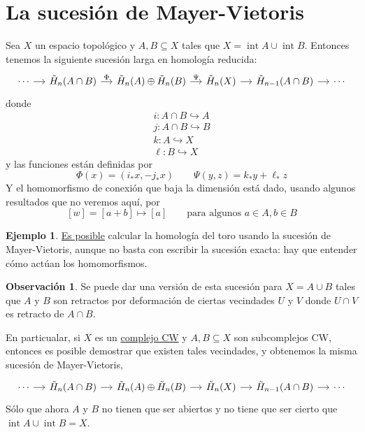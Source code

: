 \documentclass[spanish]{book}
\theoremstyle{definition}
\newtheorem*{obs}{Observación}
\newtheorem*{ejem}{Ejemplo}
\DeclareMathOperator{\Int}{int}
\begin{document}
\section{La sucesión de Mayer-Vietoris}
	Sea $X$ un espacio topológico y $A,B\subseteq X$ tales que $X=\Int A\cup \Int B$. Entonces tenemos la siguiente sucesión larga en homología reducida:
	\[\begin{tikzcd}[column sep= small]
		\cdots \arrow[r] & \tilde{H}_n(A\cap B) \arrow[r,"\Phi"] & \tilde{H}_n(A) \oplus \tilde{H}_n(B) \arrow[r,"\Psi"] & \tilde{H}_n(X) \arrow[r] & \tilde{H}_{n-1}(A\cap B) \arrow[r] &\cdots
	\end{tikzcd}\]
	donde 
	\begin{align*}
		i:A\cap B\hookrightarrow A\\
		j:A\cap B\hookrightarrow B\\
		k:A\hookrightarrow X\\
		\ell:B\hookrightarrow X
	\end{align*}
	y las funciones están definidas por
	\[\Phi(x)=(i_*x,-j_*x)\qquad\Psi(y,z)=k_*y+\ell_*z \]
	Y el homomorfismo de conexión que baja la dimensión está dado, usando algunos resultados que no veremos aquí, por
	\[[w]=[a+b]\mapsto[a]\qquad\text{para algunos }a\in A,b\in B\]
	\begin{ejem}
		\href{https://math.stackexchange.com/questions/58311/the-homology-groups-of-t2-by-mayer-vietoris}{Es posible} calcular la homología del toro usando la sucesión de Mayer-Vietoris, aunque no basta con escribir la sucesión exacta: hay que entender cómo actúan los homomorfismos.
	\end{ejem}
	\begin{obs}
		Se puede dar una versión de esta sucesión para $X=A\cup B$ tales que $A$ y $B$ son retractos por deformación de ciertas vecindades $U$ y $V$ donde $U\cap V$ es retracto de $A\cap B$.
		
		En particualar, si $X$ es un \hyperref[chap:CCW]{complejo CW} y $A,B\subseteq X$ son subcomplejos CW, entonces es posible demostrar que existen tales vecindades, y obtenemos la misma sucesión de Mayer-Vietoris,
		\[\begin{tikzcd}[column sep= small]
			\cdots \arrow[r] & \tilde{H}_n(A\cap B) \arrow[r] & \tilde{H}_n(A) \oplus \tilde{H}_n(B) \arrow[r] & \tilde{H}_n(X) \arrow[r] & \tilde{H}_{n-1}(A\cap B) \arrow[r] &\cdots
		\end{tikzcd}\]
		Sólo que ahora $A$ y $B$ no tienen que ser abiertos y no tiene que ser cierto que $\Int A\cup\Int B=X$.
	\end{obs}
\end{document}
